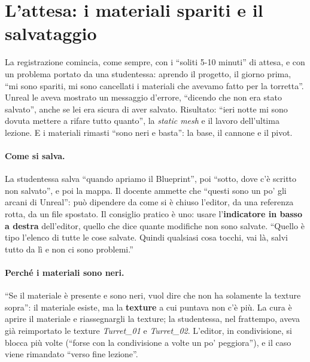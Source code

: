 \section{L'attesa: i materiali spariti e il salvataggio}
\label{ue5:sec:attesa}

La registrazione comincia, come sempre, con i ``soliti 5-10 minuti'' di attesa, e con
un problema portato da una studentessa: aprendo il progetto, il giorno prima, ``mi sono
spariti, mi sono cancellati i materiali che avevamo fatto per la torretta''. Unreal le
aveva mostrato un messaggio d'errore, ``dicendo che non era stato salvato'', anche se
lei era sicura di aver salvato. Risultato: ``ieri notte mi sono dovuta mettere a rifare
tutto quanto'', la \emph{static mesh} e il lavoro dell'ultima lezione. E i materiali
rimasti ``sono neri e basta'': la base, il cannone e il pivot.

\paragraph{Come si salva.} La studentessa salva ``quando apriamo il Blueprint'', poi
``sotto, dove c'è scritto non salvato'', e poi la mappa. Il docente ammette che ``questi
sono un po' gli arcani di Unreal'': può dipendere da come si è chiuso l'editor, da una
referenza rotta, da un file spostato. Il consiglio pratico è uno: usare
l'\textbf{indicatore in basso a destra} dell'editor, quello che dice quante modifiche
non sono salvate. ``Quello è tipo l'elenco di tutte le cose salvate. Quindi qualsiasi
cosa tocchi, vai là, salvi tutto da lì e non ci sono problemi.''

\paragraph{Perché i materiali sono neri.} ``Se il materiale è presente e sono neri, vuol
dire che non ha solamente la texture sopra'': il materiale esiste, ma la
\textbf{texture} a cui puntava non c'è più. La cura è aprire il materiale e
riassegnargli la texture; la studentessa, nel frattempo, aveva già reimportato le
texture \emph{Turret\_01} e \emph{Turret\_02}. L'editor, in condivisione, si blocca più
volte (``forse con la condivisione a volte un po' peggiora''), e il caso viene rimandato
``verso fine lezione''.

